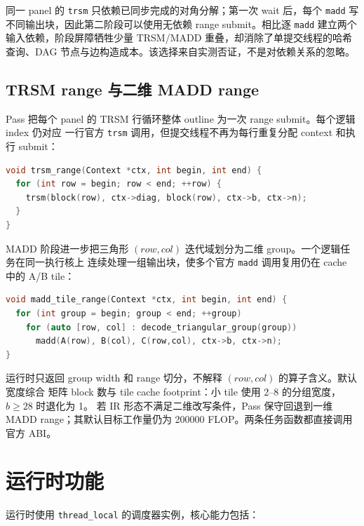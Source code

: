 \documentclass[UTF8,a4paper,openany,11pt,fontset=fandol]{ctexrep}
\begin{document}
同一 panel 的 \texttt{trsm} 只依赖已同步完成的对角分解；第一次 wait 后，每个
\texttt{madd} 写不同输出块，因此第二阶段可以使用无依赖 range submit。相比逐 \texttt{madd}
建立两个输入依赖，阶段屏障牺牲少量 TRSM/MADD 重叠，却消除了单提交线程的哈希查询、DAG
节点与边构造成本。该选择来自实测否证，不是对依赖关系的忽略。

\subsection{TRSM range 与二维 MADD range}

Pass 把每个 panel 的 TRSM 行循环整体 outline 为一次 range submit。每个逻辑 index 仍对应
一行官方 \texttt{trsm} 调用，但提交线程不再为每行重复分配 context 和执行 submit：

\begin{lstlisting}[language=C++,caption={TRSM range 的语义化伪代码}]
void trsm_range(Context *ctx, int begin, int end) {
  for (int row = begin; row < end; ++row) {
    trsm(block(row), ctx->diag, block(row), ctx->b, ctx->n);
  }
}
\end{lstlisting}

MADD 阶段进一步把三角形 \((row,col)\) 迭代域划分为二维 group。一个逻辑任务在同一执行核上
连续处理一组输出块，使多个官方 \texttt{madd} 调用复用仍在 cache 中的 A/B tile：

\begin{lstlisting}[language=C++,caption={二维 MADD range 的语义化伪代码}]
void madd_tile_range(Context *ctx, int begin, int end) {
  for (int group = begin; group < end; ++group)
    for (auto [row, col] : decode_triangular_group(group))
      madd(A(row), B(col), C(row,col), ctx->b, ctx->n);
}
\end{lstlisting}

运行时只返回 group width 和 range 切分，不解释 \((row,col)\) 的算子含义。默认宽度综合
矩阵 block 数与 tile cache footprint：小 tile 使用 2--8 的分组宽度，\(b\ge28\) 时退化为 1。
若 IR 形态不满足二维改写条件，Pass 保守回退到一维 MADD range；其默认目标工作量仍为
200000 FLOP。两条任务函数都直接调用官方 ABI。

\section{运行时功能}

运行时使用 \texttt{thread\_local} 的调度器实例，核心能力包括：
\end{document}
